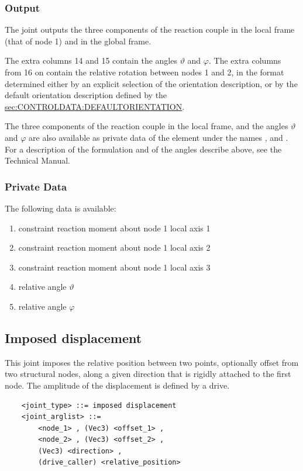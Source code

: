 \subsubsection{Output}
The  joint outputs the three components
of the reaction couple in the local frame (that of node 1) 
and in the global frame.

The extra columns 14 and 15 contain the angles $\vartheta$ and $\varphi$.
The extra columns from 16 on contain the relative rotation
between nodes 1 and 2, in the format determined either by an explicit
selection of the orientation description, or by the default
orientation description defined by the 
\hyperref{\kw{default orientation} keyword}{\kw{default orientation} keyword (see Section~}{)}{sec:CONTROLDATA:DEFAULTORIENTATION}.

The three components of the reaction couple in the local frame, 
and the angles $\vartheta$ and $\varphi$ are also available
as private data of the element under the names ,
 and .
For a description of the formulation and of the angles describe above,
see the Technical Manual.

\subsubsection{Private Data}
The following data is available:
\begin{enumerate}
\item {} constraint reaction moment about node 1 local axis 1
\item {} constraint reaction moment about node 1 local axis 2
\item {} constraint reaction moment about node 1 local axis 3
\item {} relative angle $\vartheta$
\item {} relative angle $\varphi$
\end{enumerate}



\subsection{Imposed displacement}
\label{sec:EL:JOINT:IMPOSEDDISPLACEMENT}
This joint imposes the relative position between two points,
optionally offset from two structural nodes,
along a given direction that is rigidly attached to the first node.
The amplitude of the displacement is defined by a drive.
\begin{verbatim}
    <joint_type> ::= imposed displacement
    <joint_arglist> ::= 
        <node_1> , (Vec3) <offset_1> ,
        <node_2> , (Vec3) <offset_2> ,
        (Vec3) <direction> ,
        (drive_caller) <relative_position>
\end{verbatim}

